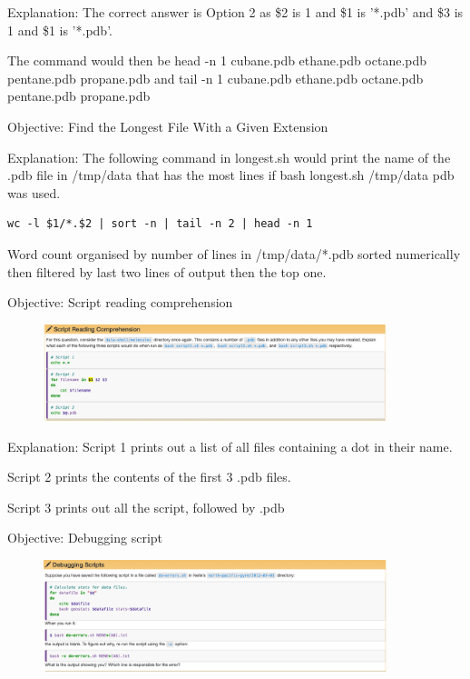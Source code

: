 \documentclass{article}
\begin{document}
Explanation: The correct answer is Option 2 as \$2 is 1 and \$1 is '*.pdb' and \$3 is 1 and \$1 is '*.pdb'. 

The command would then be head -n 1 cubane.pdb ethane.pdb octane.pdb pentane.pdb propane.pdb
and tail -n 1 cubane.pdb ethane.pdb octane.pdb pentane.pdb propane.pdb

Objective: Find the Longest File With a Given Extension

Explanation: The following command in longest.sh would  print the name of the .pdb file in /tmp/data that has the most lines if bash longest.sh /tmp/data pdb was used.

\begin{verbatim}wc -l $1/*.$2 | sort -n | tail -n 2 | head -n 1\end{verbatim}

Word count organised by number of lines in /tmp/data/*.pdb sorted numerically then filtered by last two lines of output then the top one.

Objective: Script reading comprehension

\begin{figure}[htp]
    \centering
    \includegraphics[width=10cm]{Screenshot22.png}
    \label{fig:ls-22}
\end{figure}

Explanation: Script 1 prints out a list of all files containing a dot in their name. 

Script 2 prints the contents of the first 3 .pdb files. 

Script 3 prints out all the script, followed by .pdb

Objective: Debugging script

\begin{figure}[htp]
    \centering
    \includegraphics[width=10cm]{Screenshot23.png}
    \label{fig:ls-23}
\end{figure}
\end{document}
